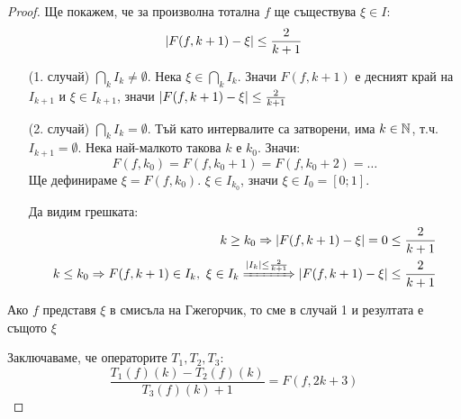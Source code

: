\begin{proof}
    Ще покажем, че за произволна тотална $f$ ще съществува $\xi \in I$:
    \begin{equation}
        \left|F(f, k+1) - \xi\right| \leq \frac{2}{k+1}
    \end{equation}
    \begin{itemize}
        \item[(1. случай)] $\bigcap_k I_k \neq \emptyset$. Нека $\xi \in \bigcap_k I_k$. Значи $F(f, k+1)$ е десният край на $I_{k+1}$ и $\xi \in I_{k+1}$, значи $\left|F(f, k+1) - \xi\right| \leq \frac{2}{k+1}$
        \item[(2. случай)] $\bigcap_k I_k = \emptyset$. Тъй като интервалите са затворени, има $k \in {\mathbb{N}}$, т.ч. $I_{k+1} = \emptyset$. Нека най-малкото такова $k$ е $k_0$. Значи:
        \begin{equation}
            F(f, k_0) = F(f, k_0 + 1) = F(f, k_0 + 2) = \dots
        \end{equation}
        Ще дефинираме $\xi = F(f, k_0)$. $\xi \in I_{k_0}$, значи $\xi \in I_0 = [0; 1]$. 

        Да видим грешката:
        \begin{equation}
            \begin{split}
                k \geq k_0 \Rightarrow \left|F(f, k+1) - \xi\right| = 0 \leq \frac{2}{k+1} \\
                k \leq k_0 \Rightarrow F(f, k+1) \in I_k,\ \xi \in I_k \xRightarrow{\ensuremath{\left|I_k\right|} \leq \frac{2}{k+1}} \left|F(f, k+1) - \xi\right| \leq \frac{2}{k+1}
            \end{split}
        \end{equation}
    \end{itemize}

    Ако $f$ представя $\xi$ в смисъла на Гжегорчик, то сме в случай 1 и резултата е същото $\xi$

    Заключаваме, че операторите $T_1, T_2, T_3$:
    \begin{equation}
        \frac{T_1(f)(k) - T_2(f)(k)}{T_3(f)(k) + 1} = F(f, 2k+3)
    \end{equation}
\end{proof}